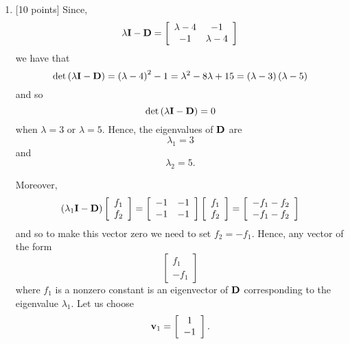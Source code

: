 \begin{solution}
\begin{enumerate}
\item {[10 points]} Since,
\[
\lambda{\bf I}-{\bf D}=\left[\begin{array}{cc}\lambda-4 & -1\\-1 & \lambda-4\end{array}\right]
\]
we have that
\[
\det\left(\lambda{\bf I}-{\bf D}\right)=\left(\lambda-4\right)^2-1=\lambda^2-8\lambda+15=\left(\lambda-3\right)\left(\lambda-5\right)
\]
and so
\[
\det\left(\lambda{\bf I}-{\bf D}\right)=0
\]
when $\lambda=3$ or $\lambda=5$. Hence, the eigenvalues of ${\bf D}$ are
\[
\lambda_1=3
\]
and
\[
\lambda_2=5.
\]

Moreover,
\[
\left(\lambda_1{\bf I}-{\bf D}\right)\left[\begin{array}{c}f_1 \\ f_2\end{array}\right]=\left[\begin{array}{cc}-1 & -1\\-1 & -1\end{array}\right]\left[\begin{array}{c}f_1 \\ f_2\end{array}\right]=\left[\begin{array}{c}-f_1-f_2 \\ -f_1-f_2\end{array}\right]
\]
and so to make this vector zero we need to set $f_2=-f_1$. Hence, any vector of the form
\[
\left[\begin{array}{c}f_1 \\ -f_1\end{array}\right]
\]
where $f_1$ is a nonzero constant is an eigenvector of ${\bf D}$ corresponding to the eigenvalue $\lambda_1$. Let us choose
\[
{\bf v}_1=\left[\begin{array}{c}1 \\ -1\end{array}\right].
\]


\end{enumerate}
\end{solution}

